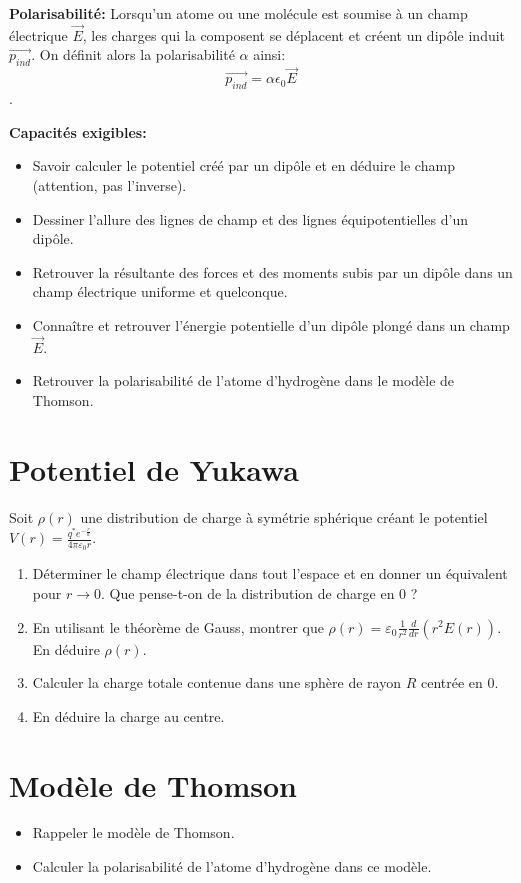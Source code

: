 \documentclass{article}
\begin{document}
\textbf{Polarisabilité: }
Lorsqu'un atome ou une molécule est soumise à un champ électrique $\vec{E}$, les charges qui la composent se déplacent et créent un dipôle induit $\vec{p_{ind}}$. On définit alors la polarisabilité $\alpha$ ainsi: 
$$ \vec{p_{ind}} = \alpha \epsilon_0 \vec{E} $$. 

\textbf{Capacités exigibles: }

\begin{itemize}
  \item Savoir calculer le potentiel créé par un dipôle et en déduire le champ (attention, pas l'inverse).
  \item Dessiner l'allure des lignes de champ et des lignes équipotentielles d'un dipôle. 
  \item Retrouver la résultante des forces et des moments subis par un dipôle dans un champ électrique uniforme et quelconque. 
  \item Connaître et retrouver l'énergie potentielle d'un dipôle plongé dans un champ $\vec{E}$. 
  \item Retrouver la polarisabilité de l'atome d'hydrogène dans le modèle de Thomson. 
\end{itemize}


\section{Potentiel de Yukawa} 
Soit $\rho(r)$ une distribution de charge à symétrie sphérique créant le potentiel $V(r) = \frac{q^*e^{-\frac{r}{a}}}{4 \pi \varepsilon_0 r }$.
\begin{enumerate}
    \item Déterminer le champ électrique dans tout l'espace et en donner un équivalent pour $r \rightarrow 0$. Que pense-t-on de la distribution de charge en 0 ? 
    \item En utilisant le théorème de Gauss, montrer que $\rho(r) = \varepsilon_0 \frac{1}{r^2} \frac{d}{dr}(r^2 E(r))$. En déduire $\rho(r)$. 
    \item Calculer la charge totale contenue dans une sphère de rayon $R$ centrée en 0.
    \item En déduire la charge au centre.
\end{enumerate}

\section{Modèle de Thomson}

\begin{itemize}
  \item Rappeler le modèle de Thomson.
  \item Calculer la polarisabilité de l'atome d'hydrogène dans ce modèle.
\end{itemize}
\end{document}
